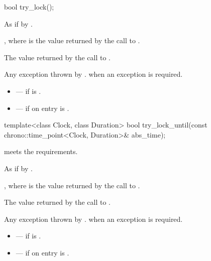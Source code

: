 %
\begin{itemdecl}
bool try_lock();
\end{itemdecl}

\begin{itemdescr}
\pnum
\effects
As if by .

\pnum
\ensures
{}, where  is the value returned by
the call to .

\pnum
\returns
The value returned by the call to .

\pnum
\throws
Any exception thrown by .
 when an exception is required.

\pnum
\errors
\begin{itemize}
\item {} --- if  is .
\item {} --- if on entry  is
.
\end{itemize}
\end{itemdescr}

%
\begin{itemdecl}
template<class Clock, class Duration>
  bool try_lock_until(const chrono::time_point<Clock, Duration>& abs_time);
\end{itemdecl}

\begin{itemdescr}
\pnum
\expects
{} meets the 
requirements.

\pnum
\effects
As if by .

\pnum
\ensures
{}, where  is the value returned by
the call to .

\pnum
\returns
The value returned by the call to
.

\pnum
\throws
Any exception thrown by .
 when an exception is required.

\pnum
\errors
\begin{itemize}
\item {} --- if  is .
\item {} --- if on entry  is
.
\end{itemize}
\end{itemdescr}

